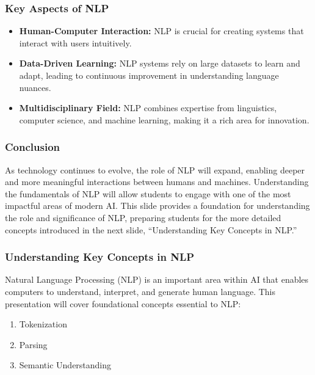 \documentclass[aspectratio=169]{beamer}
\begin{document}
\begin{frame}[fragile]
    \frametitle{Key Aspects of NLP}
    \begin{itemize}
        \item \textbf{Human-Computer Interaction:} NLP is crucial for creating systems that interact with users intuitively.
        \item \textbf{Data-Driven Learning:} NLP systems rely on large datasets to learn and adapt, leading to continuous improvement in understanding language nuances.
        \item \textbf{Multidisciplinary Field:} NLP combines expertise from linguistics, computer science, and machine learning, making it a rich area for innovation.
    \end{itemize}
\end{frame}

\begin{frame}[fragile]
    \frametitle{Conclusion}
    As technology continues to evolve, the role of NLP will expand, enabling deeper and more meaningful interactions between humans and machines. Understanding the fundamentals of NLP will allow students to engage with one of the most impactful areas of modern AI. This slide provides a foundation for understanding the role and significance of NLP, preparing students for the more detailed concepts introduced in the next slide, ``Understanding Key Concepts in NLP.''
\end{frame}

\begin{frame}[fragile]
    \frametitle{Understanding Key Concepts in NLP}
    Natural Language Processing (NLP) is an important area within AI that enables computers to understand, interpret, and generate human language. This presentation will cover foundational concepts essential to NLP:
    \begin{enumerate}
        \item Tokenization
        \item Parsing
        \item Semantic Understanding
    \end{enumerate}
\end{frame}
\end{document}
